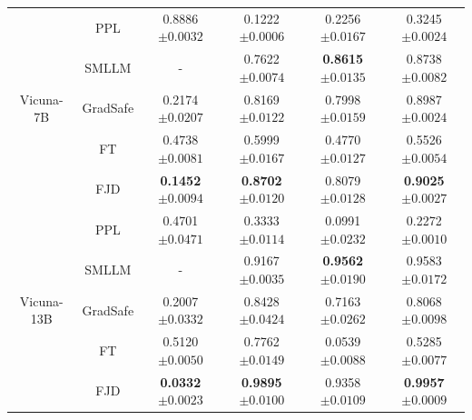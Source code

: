 \documentclass{article}
\begin{document}
\begin{table}[t]
\begin{tabular}{cccccc}
    \midrule
    \multirow{5}{*}{Vicuna-7B} 
    & PPL & 0.8886\tiny{$\pm 0.0032$} & 0.1222\tiny{$\pm 0.0006$} & 0.2256\tiny{$\pm 0.0167$} & 0.3245\tiny{$\pm 0.0024$} \\
    & SMLLM & - & 0.7622\tiny{$\pm 0.0074$} & \textbf{0.8615}\tiny{$\pm 0.0135$} & 0.8738\tiny{$\pm 0.0082$} \\
    & GradSafe & 0.2174\tiny{$\pm 0.0207$} & 0.8169\tiny{$\pm 0.0122$} & 0.7998\tiny{$\pm 0.0159$} & 0.8987\tiny{$\pm 0.0024$}     \\
    & FT & 0.4738\tiny{$\pm 0.0081$} & 0.5999\tiny{$\pm 0.0167$} & 0.4770\tiny{$\pm 0.0127$} & 0.5526\tiny{$\pm 0.0054$} \\
    & FJD & \textbf{0.1452}\tiny{$\pm 0.0094$} & \textbf{0.8702}\tiny{$\pm 0.0120$} & 0.8079\tiny{$\pm 0.0128$} & \textbf{0.9025}\tiny{$\pm 0.0027$} \\ 
    \midrule
    \multirow{5}{*}{Vicuna-13B} 
    & PPL  & 0.4701\tiny{$\pm 0.0471$} & 0.3333\tiny{$\pm 0.0114$} & 0.0991\tiny{$\pm 0.0232$} & 0.2272\tiny{$\pm 0.0010$} \\
    & SMLLM & - & 0.9167\tiny{$\pm 0.0035$} & \textbf{0.9562}\tiny{$\pm 0.0190$} & 0.9583\tiny{$\pm 0.0172$} \\
    & GradSafe & 0.2007\tiny{$\pm 0.0332$} & 0.8428\tiny{$\pm 0.0424$} & 0.7163\tiny{$\pm 0.0262$} & 0.8068\tiny{$\pm 0.0098$}   \\
    & FT & 0.5120\tiny{$\pm 0.0050$} & 0.7762\tiny{$\pm 0.0149$} & 0.0539\tiny{$\pm 0.0088$} & 0.5285\tiny{$\pm 0.0077$} \\
    & FJD & \textbf{0.0332}\tiny{$\pm 0.0023$} & \textbf{0.9895}\tiny{$\pm 0.0100$} & 0.9358\tiny{$\pm 0.0109$} & \textbf{0.9957}\tiny{$\pm 0.0009$} \\

    \bottomrule
  \end{tabular} 
\end{table}
\end{document}
